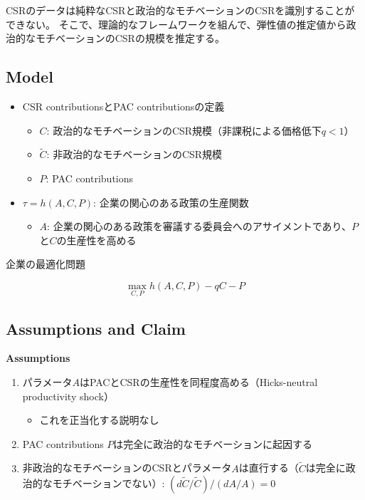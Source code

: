 \documentclass[../root]{subfiles}
\begin{document}
    CSRのデータは純粋なCSRと政治的なモチベーションのCSRを識別することができない。
    そこで、理論的なフレームワークを組んで、弾性値の推定値から政治的なモチベーションのCSRの規模を推定する。

    \subsection{Model}\label{model}

    \begin{itemize}
    
    \item
      CSR contributionsとPAC contributionsの定義

      \begin{itemize}
      
      \item
        \(C\): 政治的なモチベーションのCSR規模（非課税による価格低下\(q < 1\)）
      \item
        \(\tilde{C}\): 非政治的なモチベーションのCSR規模
      \item
        \(P\): PAC contributions
      \end{itemize}
    \item
      \(\tau = h(A, C, P)\): 企業の関心のある政策の生産関数

      \begin{itemize}
      
      \item
        \(A\): 企業の関心のある政策を審議する委員会へのアサイメントであり、\(P\)と\(C\)の生産性を高める
      \end{itemize}
    \end{itemize}

    企業の最適化問題

    \begin{equation}
    \max_{C,P} h(A, C, P) - qC - P
    \end{equation}

    \subsection{Assumptions and Claim}\label{assumptions-and-claim}

    \textbf{Assumptions}

    \begin{enumerate}
    \def\labelenumi{\arabic{enumi}.}
    
    \item
      パラメータ\(A\)はPACとCSRの生産性を同程度高める（Hicks-neutral productivity shock）

      \begin{itemize}
      
      \item
        これを正当化する説明なし
      \end{itemize}
    \item
      PAC contributions \(P\)は完全に政治的なモチベーションに起因する
    \item
      非政治的なモチベーションのCSRとパラメータ\(A\)は直行する（\(\tilde{C}\)は完全に政治的なモチベーションでない）: \((d\tilde{C}/\tilde{C})/(dA/A) = 0\)
    \end{enumerate}
\end{document}
